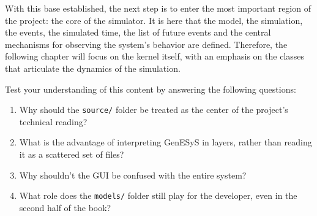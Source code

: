 With this base established, the next step is to enter the most important region of the project: the core of the simulator. It is here that the model, the simulation, the events, the simulated time, the list of future events and the central mechanisms for observing the system's behavior are defined. Therefore, the following chapter will focus on the kernel itself, with an emphasis on the classes that articulate the dynamics of the simulation.

Test your understanding of this content by answering the following questions:

\begin{enumerate}
 \item Why should the \texttt{source/} folder be treated as the center of the project's technical reading?

\item What is the advantage of interpreting GenESyS in layers, rather than reading it as a scattered set of files?

\item Why shouldn't the GUI be confused with the entire system?

\item What role does the \texttt{models/} folder still play for the developer, even in the second half of the book?
\end{enumerate}
